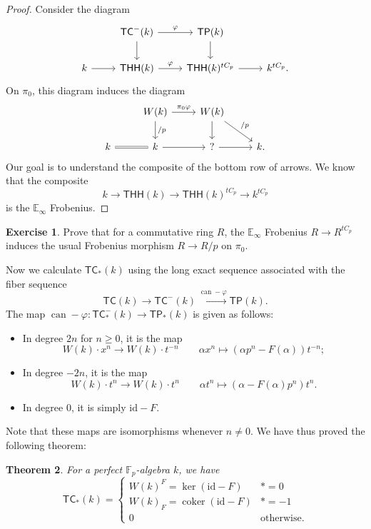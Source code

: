 \documentclass[10pt, oneside]{memoir}
\newtheorem{thm}{Theorem}[subsection]
\theoremstyle{definition}
\newtheorem{exer}[thm]{Exercise}
\theoremstyle{remark}
\theoremstyle{plain}
\theoremstyle{definition}
\theoremstyle{remark}
\newcommand{\E}{\mathbb{E}}
\newcommand{\F}{\mathbb{F}}
\newcommand{\mr}[1]{\mathrm{#1}}
\newcommand{\on}[1]{\operatorname{#1}}
\newcommand{\ms}[1]{\mathsf{#1}}
\newcommand{\1}{\mathbf{1}}
\newcommand{\2}{\mathbf{2}}
\newcommand{\3}{\mathbf{3}}
\newcommand{\THH}{\ms{THH}}
\newcommand{\TC}{\ms{TC}}
\newcommand{\TP}{\ms{TP}}
\begin{document}
\begin{proof}
    Consider the diagram
    \begin{equation*}
    \begin{tikzcd}
        & \TC^-(k) \ar{r}{\varphi} \ar{d} & \TP(k) \ar{d} \\
        k \ar{r} & \THH(k) \ar{r}{\varphi} & \THH(k)^{tC_p} \ar{r} & k^{tC_p}.
    \end{tikzcd}
    \end{equation*}
    On \(\pi_0 \), this diagram induces the diagram
    \begin{equation*}
    \begin{tikzcd}
        & W(k) \ar{r}{\pi_0 \varphi} \ar{d}{/p} & W(k) \ar{d} \ar{dr}{/p} \\
        k \ar[equals]{r} & k \ar{r} & ? \ar{r} & k.
    \end{tikzcd}
    \end{equation*}
    Our goal is to understand the composite of the bottom row of arrows. We know that the composite
    \[ k \to \THH(k) \to \THH(k)^{t C_p} \to k^{tC_p} \]
    is the \(\E_{\infty} \) Frobenius.
\end{proof}

\begin{exer}
    Prove that for a commutative ring \(R \), the \(\E_{\infty} \) Frobenius \(R \to R^{tC_p} \) induces the usual Frobenius morphism \(R \to R/p \) on \(\pi_0 \).
\end{exer}

Now we calculate \(\TC_*(k) \) using the long exact sequence associated with the fiber sequence
\[ \TC(k) \to \TC^-(k) \xrightarrow{\on{can} - \varphi} \TP(k). \]
The map \(\on{can} - \varphi \colon \TC_*^-(k) \to \TP_*(k) \) is given as follows:
\begin{itemize}
    \item In degree \(2n \) for \(n \geq 0 \), it is the map
    \[ W(k) \cdot x^n \to W(k) \cdot t^{-n} \qquad \alpha x^n \mapsto (\alpha p^n - F(\alpha)) t^{-n}; \]
    \item In degree \(-2n \), it is the map
    \[ W(k) \cdot t^n \to W(k) \cdot t^n \qquad \alpha t^n \mapsto (\alpha - F(\alpha) p^n) t^n. \]
    \item In degree \(0 \), it is simply \(\mr{id} - F \).
\end{itemize}
Note that these maps are isomorphisms whenever \(n \neq 0 \). We have thus proved the following theorem:

\begin{thm}
    For a perfect \(\F_p \)-algebra \(k \), we have
    \[ \TC_*(k) = \begin{cases}
        W(k)^F = \ker(\mr{id}-F) & *=0 \\
        W(k)_F = \on{coker}(\mr{id}-F) & *=-1 \\
        0 & \text{otherwise}.
    \end{cases} \]
\end{thm}
\end{document}
